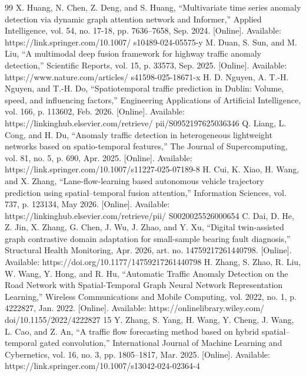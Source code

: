 \begin{thebibliography}{99}
\itemsep=0pt
 X. Huang, N. Chen, Z. Deng, and S. Huang, “Multivariate time series anomaly detection via dynamic graph attention network and Informer,” Applied Intelligence, vol. 54, no. 17-18, pp. 7636–7658, Sep. 2024. [Online]. Available: https://link.springer.com/10.1007/ s10489-024-05575-y
 M. Duan, S. Sun, and M. Liu, “A multimodal deep fusion framework for highway traffic anomaly detection,” Scientific Reports, vol. 15, p. 33573, Sep. 2025. [Online]. Available: https://www.nature.com/articles/ s41598-025-18671-x
 H. D. Nguyen, A. T.-H. Nguyen, and T.-H. Do, “Spatiotemporal traffic prediction in Dublin: Volume, speed, and influencing factors,” Engineering Applications of Artificial Intelligence, vol. 166, p. 113602, Feb. 2026. [Online]. Available: https://linkinghub.elsevier.com/retrieve/ pii/S0952197625036346
 Q. Liang, L. Cong, and H. Du, “Anomaly traffic detection in heterogeneous lightweight networks based on spatio-temporal features,” The Journal of Supercomputing, vol. 81, no. 5, p. 690, Apr. 2025. [Online]. Available: https://link.springer.com/10.1007/s11227-025-07189-8
 H. Cui, K. Xiao, H. Wang, and X. Zhang, “Lane-flow-learning based autonomous vehicle trajectory prediction using spatial–temporal fusion attention,” Information Sciences, vol. 737, p. 123134, May 2026. [Online]. Available: https://linkinghub.elsevier.com/retrieve/pii/ S0020025526000654
 C. Dai, D. He, Z. Jin, X. Zhang, G. Chen, J. Wu, J. Zhao, and Y. Xu, “Digital twin-assisted graph contrastive domain adaptation for small-sample bearing fault diagnosis,” Structural Health Monitoring, Apr. 2026, art. no. 14759217261440798. [Online]. Available: https://doi.org/10.1177/14759217261440798
 H. Zhang, S. Zhao, R. Liu, W. Wang, Y. Hong, and R. Hu, “Automatic Traffic Anomaly Detection on the Road Network with Spatial-Temporal Graph Neural Network Representation Learning,” Wireless Communications and Mobile Computing, vol. 2022, no. 1, p. 4222827, Jan. 2022. [Online]. Available: https://onlinelibrary.wiley.com/ doi/10.1155/2022/4222827 15
 Y. Zhang, S. Yang, H. Wang, Y. Cheng, J. Wang, L. Cao, and Z. An, “A traffic flow forecasting method based on hybrid spatial–temporal gated convolution,” International Journal of Machine Learning and Cybernetics, vol. 16, no. 3, pp. 1805–1817, Mar. 2025. [Online]. Available: https://link.springer.com/10.1007/s13042-024-02364-4

\end{thebibliography}

